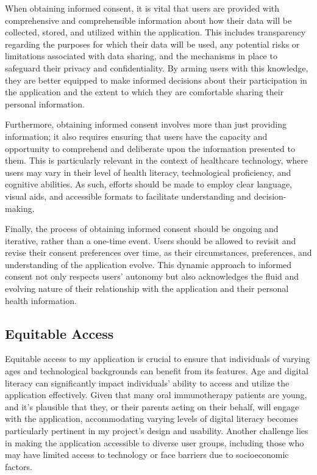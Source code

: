When obtaining informed consent, it is vital that users are provided with comprehensive and comprehensible information about how their data will be collected, stored, and utilized within the application. This includes transparency regarding the purposes for which their data will be used, any potential risks or limitations associated with data sharing, and the mechanisms in place to safeguard their privacy and confidentiality. By arming users with this knowledge, they are better equipped to make informed decisions about their participation in the application and the extent to which they are comfortable sharing their personal information.

Furthermore, obtaining informed consent involves more than just providing information; it also requires ensuring that users have the capacity and opportunity to comprehend and deliberate upon the information presented to them. This is particularly relevant in the context of healthcare technology, where users may vary in their level of health literacy, technological proficiency, and cognitive abilities. As such, efforts should be made to employ clear language, visual aids, and accessible formats to facilitate understanding and decision-making.

Finally, the process of obtaining informed consent should be ongoing and iterative, rather than a one-time event. Users should be allowed to revisit and revise their consent preferences over time, as their circumstances, preferences, and understanding of the application evolve. This dynamic approach to informed consent not only respects users' autonomy but also acknowledges the fluid and evolving nature of their relationship with the application and their personal health information.

\subsection{Equitable Access}
Equitable access to my application is crucial to ensure that individuals of varying ages and technological backgrounds can benefit from its features. Age and digital literacy can significantly impact individuals' ability to access and utilize the application effectively. Given that many oral immunotherapy patients are young, and it's plausible that they, or their parents acting on their behalf, will engage with the application, accommodating varying levels of digital literacy becomes particularly pertinent in my project's design and usability. Another challenge lies in making the application accessible to diverse user groups, including those who may have limited access to technology or face barriers due to socioeconomic factors. 

